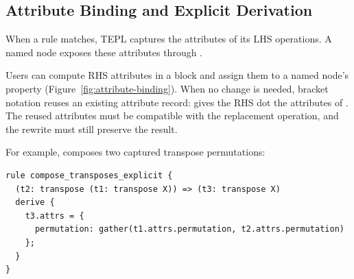 \subsection{Attribute Binding and Explicit Derivation}
\label{sec:binding}

When a rule matches, TEPL captures the attributes of its LHS operations.
A named node exposes these attributes through .

Users can compute RHS attributes in a  block and assign
them to a named node's  property
(Figure~\ref{fig:attribute-binding}).
When no change is needed, bracket notation reuses an existing attribute
record:  gives the RHS dot the attributes of
. The reused attributes must be compatible with the replacement
operation, and the rewrite must still preserve the result.

\par\wrapstuffclear
\noindent\begin{minipage}{\linewidth}
For example,  composes two captured transpose permutations:
\begin{lstlisting}[language=TEPL]
rule compose_transposes_explicit {
  (t2: transpose (t1: transpose X)) => (t3: transpose X)
  derive {
    t3.attrs = {
      permutation: gather(t1.attrs.permutation, t2.attrs.permutation)
    };
  }
}
\end{lstlisting}
\end{minipage}

